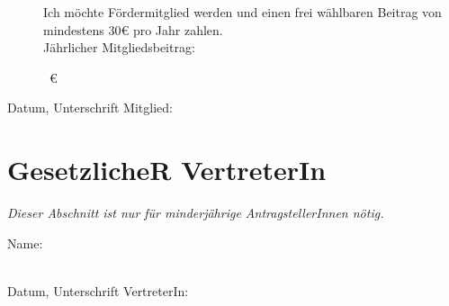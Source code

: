\documentclass[a4paper,11pt]{scrartcl}
\newcommand{\signskip}{\rule{0pt}{24pt}}
\newcommand{\smallsignskip}{\rule{0pt}{16pt}}
\newcommand{\hinweis}[1]{\emph{#1}}
\begin{document}
\begin{description}
  \item[\Square] Ich möchte Fördermitglied werden und einen frei wählbaren
    Beitrag von mindestens 30€ pro Jahr zahlen. \\
    Jährlicher Mitgliedsbeitrag: \hrulefill\signskip~€\hfill\phantom{a}
\end{description}
Datum, Unterschrift Mitglied: \hrulefill\smallsignskip

\section*{GesetzlicheR VertreterIn}
\hinweis{Dieser Abschnitt ist nur für minderjährige AntragstellerInnen nötig.}

Name: \hrulefill \signskip \\
Datum, Unterschrift VertreterIn: \hrulefill \signskip
\end{document}
